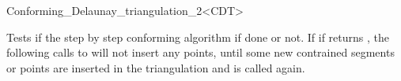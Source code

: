 \begin{ccRefClass}{Conforming_Delaunay_triangulation_2<CDT>}
\begin{ccAdvanced}
\ccGlue
{}

{ Tests if the step by step conforming algorithm if done or not. If if
  returns , the following calls to
   will not insert any points, until some
  new contrained segments or points are inserted in the triangulation and
   is called again. }

\end{ccAdvanced}

\end{ccRefClass}

